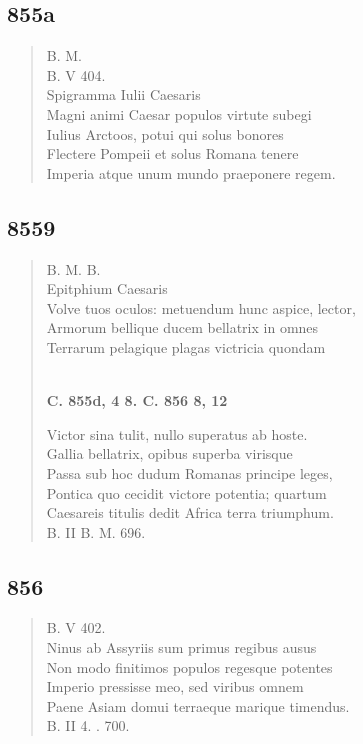 \documentclass[11pt, a4paper]{report}
\begin{document}
            \subsection*{855a}
      \begin{verse}
      B. M. \\ B. V 404. \\ Spigramma Iulii Caesaris \\ Magni animi Caesar populos virtute subegi \\ Iulius Arctoos, potui qui solus bonores \\ Flectere Pompeii et solus Romana tenere \\ Imperia atque unum mundo praeponere regem. \\ 
      \end{verse}
  
            \subsection*{8559}
      \begin{verse}
      B. M. B. \\ Epitphium Caesaris \\ Volve tuos oculos: metuendum hunc aspice, lector, \\ Armorum bellique ducem bellatrix in omnes \\ Terrarum pelagique plagas victricia quondam \\ 
        ﻿\pagebreak 
    \begin{center} \textbf{C. 855d, 4 8. C. 856 8, 12} \end{center} \marginpar{[311]} Victor sina tulit, nullo superatus ab hoste. \\ Gallia bellatrix, opibus superba virisque \\ Passa sub hoc dudum Romanas principe leges, \\ Pontica quo cecidit victore potentia; quartum \\ Caesareis titulis dedit Africa terra triumphum. \\ B. II B. M. 696. \\ 
      \end{verse}
  
            \subsection*{856}
      \begin{verse}
      B. V 402. \\ Ninus ab Assyriis sum primus regibus ausus \\ Non modo finitimos populos regesque potentes \\ Imperio pressisse meo, sed viribus omnem \\ Paene Asiam domui terraeque marique timendus. \\ B. II 4. . 700. \\ 
      \end{verse}
  
\end{document}
